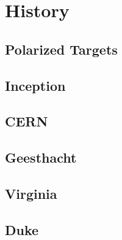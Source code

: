\chapter{History} 
\label{history} %

\section{Polarized Targets}

\section{Inception}  
 
\section{CERN} 
 
\section{Geesthacht} 

\section{Virginia}

\section{Duke}